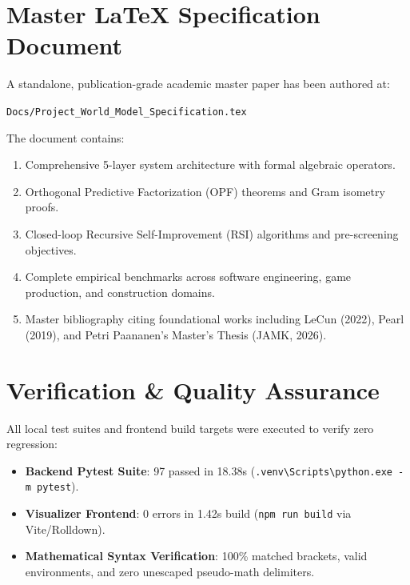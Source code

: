 \documentclass[11pt,a4paper]{article}
\begin{document}
\section{Master \LaTeX{} Specification Document}

A standalone, publication-grade academic master paper has been authored at:
\begin{center}
\texttt{Docs/Project\_World\_Model\_Specification.tex}
\end{center}
The document contains:
\begin{enumerate}
    \item Comprehensive 5-layer system architecture with formal algebraic operators.
    \item Orthogonal Predictive Factorization (OPF) theorems and Gram isometry proofs.
    \item Closed-loop Recursive Self-Improvement (RSI) algorithms and pre-screening objectives.
    \item Complete empirical benchmarks across software engineering, game production, and construction domains.
    \item Master bibliography citing foundational works including LeCun (2022), Pearl (2019), and Petri Paananen's Master's Thesis (JAMK, 2026).
\end{enumerate}

\section{Verification \& Quality Assurance}

All local test suites and frontend build targets were executed to verify zero regression:
\begin{itemize}
    \item \textbf{Backend Pytest Suite}: 97 passed in 18.38s (\texttt{.venv\textbackslash Scripts\textbackslash python.exe -m pytest}).
    \item \textbf{Visualizer Frontend}: 0 errors in 1.42s build (\texttt{npm run build} via Vite/Rolldown).
    \item \textbf{Mathematical Syntax Verification}: 100\% matched brackets, valid environments, and zero unescaped pseudo-math delimiters.
\end{itemize}
\end{document}
